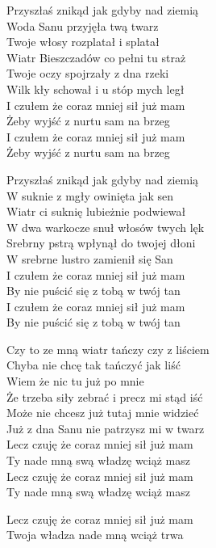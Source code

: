 \begin{text}
    \chordfill
    \chordfill
    Przyszłaś znikąd jak gdyby nad ziemią\\
    Woda Sanu przyjęła twą twarz\\
    Twoje włosy rozplatał i splatał\\
    Wiatr Bieszczadów co pełni tu straż\\
    Twoje oczy spojrzały z dna rzeki\\
    Wilk kły schował i u stóp mych legł\\
    I czułem że coraz mniej sił już mam\\
    Żeby wyjść z nurtu sam na brzeg\\
    I czułem że coraz mniej sił już mam\\
    Żeby wyjść z nurtu sam na brzeg

    Przyszłaś znikąd jak gdyby nad ziemią\\
    W suknie z mgły owinięta jak sen\\
    Wiatr ci suknię lubieżnie podwiewał\\
    W dwa warkocze snuł włosów twych lęk\\
    Srebrny pstrą wpłynął do twojej dłoni\\
    W srebrne lustro zamienił się San\\
    I czułem że coraz mniej sił już mam\\
    By nie puścić się z tobą w twój tan\\
    I czułem że coraz mniej sił już mam\\
    By nie puścić się z tobą w twój tan

    Czy to ze mną wiatr tańczy czy z liściem\\
    Chyba nie chcę tak tańczyć jak liść\\
    Wiem że nic tu już po mnie\\
    Że trzeba siły zebrać i precz mi stąd iść\\
    Może nie chcesz już tutaj mnie widzieć\\
    Już z dna Sanu nie patrzysz mi w twarz\\
    Lecz czuję że coraz mniej sił już mam\\
    Ty nade mną swą władzę wciąż masz\\
    Lecz czuję że coraz mniej sił już mam\\
    Ty nade mną swą władzę wciąż masz

    Lecz czuję że coraz mniej sił już mam\\
    Twoja władza nade mną wciąż trwa
\end{text}
